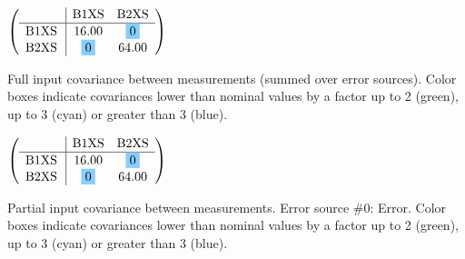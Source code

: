 \begin{table}[H]
\scriptsize
\begin{center}
\renewcommand{\arraystretch}{1.1}
\begin{math}\left(\begin{array}{c|cc}
 & \mathrm{B1XS} & 
\mathrm{B2XS} \\
\hline
\mathrm{B1XS} \hspace*{2pt} &      16.00 &  \colorbox{SkyBlue1}{$ 0$} \\
\mathrm{B2XS} \hspace*{2pt} &  \colorbox{SkyBlue1}{$ 0$} &      64.00 \\
\end{array}\right)\end{math}
\caption{Full input covariance between measurements (summed over error sources). Color boxes indicate covariances lower than nominal values by a factor up to 2 (green), up to 3 (cyan) or greater than 3 (blue).}
\renewcommand{\arraystretch}{1}
\end{center}
\end{table}
\begin{table}[H]
\scriptsize
\begin{center}
\renewcommand{\arraystretch}{1.1}
\begin{math}\left(\begin{array}{c|cc}
 & \mathrm{B1XS} & 
\mathrm{B2XS} \\
\hline
\mathrm{B1XS} \hspace*{2pt} &      16.00 &  \colorbox{SkyBlue1}{$ 0$} \\
\mathrm{B2XS} \hspace*{2pt} &  \colorbox{SkyBlue1}{$ 0$} &      64.00 \\
\end{array}\right)\end{math}
\caption{Partial input covariance between measurements. Error source \#0: Error. Color boxes indicate covariances lower than nominal values by a factor up to 2 (green), up to 3 (cyan) or greater than 3 (blue).}
\renewcommand{\arraystretch}{1}
\end{center}
\end{table}
